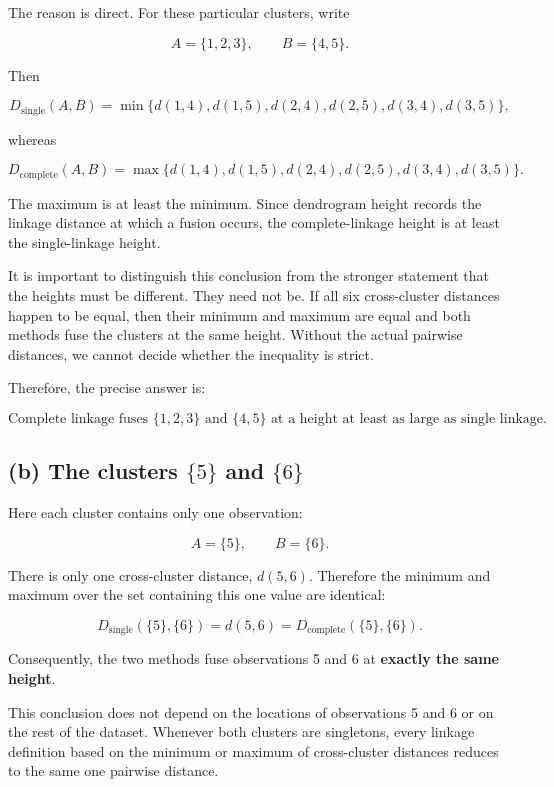 \documentclass[
  11pt,
]{article}
\begin{document}
The reason is direct. For these particular clusters, write

\[
A=\{1,2,3\}, \qquad B=\{4,5\}.
\]

Then

\[
D_{\mathrm{single}}(A,B)
= \min\{d(1,4),d(1,5),d(2,4),d(2,5),d(3,4),d(3,5)\},
\]

whereas

\[
D_{\mathrm{complete}}(A,B)
= \max\{d(1,4),d(1,5),d(2,4),d(2,5),d(3,4),d(3,5)\}.
\]

The maximum is at least the minimum. Since dendrogram height records the
linkage distance at which a fusion occurs, the complete-linkage height
is at least the single-linkage height.

It is important to distinguish this conclusion from the stronger
statement that the heights must be different. They need not be. If all
six cross-cluster distances happen to be equal, then their minimum and
maximum are equal and both methods fuse the clusters at the same height.
Without the actual pairwise distances, we cannot decide whether the
inequality is strict.

Therefore, the precise answer is:

\[
\boxed{
\text{Complete linkage fuses }\{1,2,3\}\text{ and }\{4,5\}
\text{ at a height at least as large as single linkage.}
}
\]

\subsection{\texorpdfstring{(b) The clusters \(\{5\}\) and
\(\{6\}\)}{(b) The clusters \textbackslash\{5\textbackslash\} and \textbackslash\{6\textbackslash\}}}\label{b-the-clusters-5-and-6}

Here each cluster contains only one observation:

\[
A=\{5\}, \qquad B=\{6\}.
\]

There is only one cross-cluster distance, \(d(5,6)\). Therefore the
minimum and maximum over the set containing this one value are
identical:

\[
D_{\mathrm{single}}(\{5\},\{6\})
= d(5,6)
= D_{\mathrm{complete}}(\{5\},\{6\}).
\]

Consequently, the two methods fuse observations 5 and 6 at
\textbf{exactly the same height}.

This conclusion does not depend on the locations of observations 5 and 6
or on the rest of the dataset. Whenever both clusters are singletons,
every linkage definition based on the minimum or maximum of
cross-cluster distances reduces to the same one pairwise distance.
\end{document}
